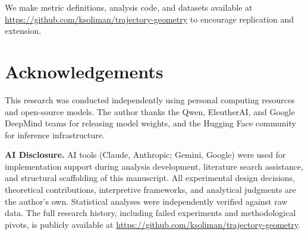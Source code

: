 \documentclass[11pt,twocolumn]{article}
\begin{document}
We make metric definitions, analysis code, and datasets available at \url{https://github.com/ksoliman/trajectory-geometry} to encourage replication and extension.


\section*{Acknowledgements}

This research was conducted independently using personal computing resources and open-source models. The author thanks the Qwen, EleutherAI, and Google DeepMind teams for releasing model weights, and the Hugging Face community for inference infrastructure.

\textbf{AI Disclosure.} AI tools (Claude, Anthropic; Gemini, Google) were used for implementation support during analysis development, literature search assistance, and structural scaffolding of this manuscript. All experimental design decisions, theoretical contributions, interpretive frameworks, and analytical judgments are the author's own. Statistical analyses were independently verified against raw data. The full research history, including failed experiments and methodological pivots, is publicly available at \url{https://github.com/ksoliman/trajectory-geometry}.



\end{document}
